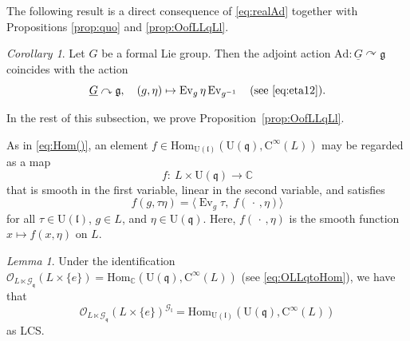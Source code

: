 \documentclass[12pt, a4paper]{amsart}
\newcommand{\BC}{{\mathbb {C}}}
\newcommand{\CG}{{\mathcal {G}}}
\newcommand{\CO}{{\mathcal {O}}}
\newcommand{\RC}{{\mathrm {C}}}
\newcommand{\RU}{{\mathrm {U}}}
\newcommand{\Ad}{{\mathrm{Ad}}}
\newcommand{\Hom}{{\mathrm{Hom}}}
\newcommand{\Ev}{\operatorname{Ev}}
\newcommand{\g}{\mathfrak g}
\newcommand{\q}{\mathfrak q}
\renewcommand{\l}{\mathfrak l}
\newcommand{\be}{\begin {equation}}
\newcommand{\ee}{\end {equation}}
\theoremstyle{Theorem}
\theoremstyle{Theorem}
\theoremstyle{Theorem}
\theoremstyle{Theorem}
\theoremstyle{Plain}
\theoremstyle{remark}
\theoremstyle{remark}
\theoremstyle{Definition}
\newtheorem{cord}[dfn]{Corollary}
\newtheorem{lemd}[dfn]{Lemma}
\numberwithin{equation}{section}
\begin{document}


The following result is a direct consequence of \eqref{eq:realAd} together with Propositions \ref{prop:quo} and \ref{prop:OofLLqLl}.


\begin{cord}\label{cor:realAd}
  Let $G$ be a formal Lie group. Then the adjoint action $\Ad: \underline{G}\curvearrowright\g$ coincides with the action 
\be\underline{G}\curvearrowright \g, \quad (g,\eta)\mapsto \Ev_g\eta\Ev_{g^{-1}}\quad\text{(see \eqref{eq:eta12})}.\ee
\end{cord}

In the rest of this subsection, we prove Proposition~\ref{prop:OofLLqLl}. 

As in \eqref{eq:Hom()}, an element $f\in\Hom_{\RU(\l)}(\RU(\q),\RC^\infty(L))$ may be regarded as a map
\be \label{eq:Ueq}
f:\ L\times\RU(\q)\longrightarrow \BC
\ee
that is smooth in the first variable, linear in the second variable, and satisfies
\[
f(g,\tau\eta)=\bigl\langle \Ev_g\tau,\; f(\,\cdot\,,\eta) \bigr\rangle
\]
for all $\tau\in\RU(\l)$, $g\in L$, and $\eta\in\RU(\q)$. Here, $f(\,\cdot\,,\eta)$ is the smooth function $x\mapsto f(x,\eta)$ on $L$.

\begin{lemd}\label{lem:OtoHoml}
Under the identification $\CO_{L\ltimes \CG_{\q}}(L\times \{e\})=\Hom_{\BC}(\RU(\q), \RC^{\infty}(L))$ (see \eqref{eq:OLLqtoHom}), we have that
\be\label{eq:OsubHom=}
\CO_{L\ltimes \CG_{\q}}(L\times \{e\})^{\CG_{\l}}
=
\Hom_{\RU(\l)}(\RU(\q), \RC^{\infty}(L))
\ee
as LCS.
\end{lemd}
\end{document}
